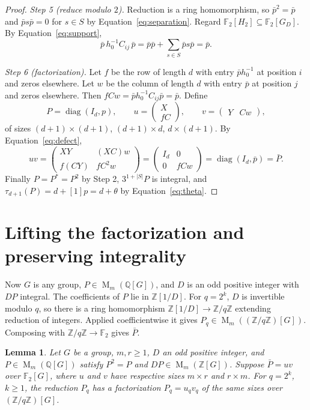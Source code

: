 \documentclass[11pt]{article}
\newtheorem{lemma}[theorem]{Lemma}
\theoremstyle{remark}
\numberwithin{equation}{section}
\newcommand{\F}{\mathbb F}
\newcommand{\Z}{\mathbb Z}
\newcommand{\Q}{\mathbb Q}
\newcommand{\Mat}{\operatorname{M}}
\newcommand{\diag}{\operatorname{diag}}
\begin{document}
\begin{proof}
\emph{Step 5 (reduce modulo $2$).} Reduction is a ring homomorphism, so $\bar p^2=\bar p$ and $\bar ps\bar p=0$ for $s\in S$ by Equation~\eqref{eq:separation}. Regard $\F_2[H_2]\subseteq\F_2[G_D]$. By Equation~\eqref{eq:support},
\[
 \bar p\,h_0^{-1}C_{ij}\,\bar p=\bar p\bar p+\sum_{s\in S}\bar ps\bar p=\bar p.
\]

\emph{Step 6 (factorization).} Let $f$ be the row of length $d$ with entry $\bar ph_0^{-1}$ at position $i$ and zeros elsewhere. Let $w$ be the column of length $d$ with entry $\bar p$ at position $j$ and zeros elsewhere. Then $fCw=\bar ph_0^{-1}C_{ij}\bar p=\bar p$. Define
\[
 P=\diag(I_d,p),\qquad
 u=\begin{pmatrix}X\\fC\end{pmatrix},\qquad
 v=\begin{pmatrix}Y&Cw\end{pmatrix},
\]
of sizes $(d+1)\times(d+1)$, $(d+1)\times d$, $d\times(d+1)$. By Equation~\eqref{eq:defect},
\[
 uv=\begin{pmatrix}XY&(XC)w\\f(CY)&fC^2w\end{pmatrix}
   =\begin{pmatrix}I_d&0\\0&fCw\end{pmatrix}=\diag(I_d,\bar p)=\bar P.
\]
Finally $P=P^*=P^2$ by Step 2, $3^{1+|S|}P$ is integral, and $\tau_{d+1}(P)=d+[1]p=d+\theta$ by Equation~\eqref{eq:theta}.
\end{proof}

\section{Lifting the factorization and preserving integrality}
\label{sec:lifting}

Now $G$ is any group, $P\in\Mat_m(\Q[G])$, and $D$ is an odd positive integer with $DP$ integral. The coefficients of $P$ lie in $\Z[1/D]$. For $q=2^k$, $D$ is invertible modulo $q$, so there is a ring homomorphism $\Z[1/D]\to\Z/q\Z$ extending reduction of integers. Applied coefficientwise it gives $P_q\in\Mat_m((\Z/q\Z)[G])$. Composing with $\Z/q\Z\to\F_2$ gives $\bar P$.

\begin{lemma}\label{lem:lift}
Let $G$ be a group, $m,r\ge1$, $D$ an odd positive integer, and
$P\in\Mat_m(\Q[G])$ satisfy $P^2=P$ and
$DP\in\Mat_m(\Z[G])$. Suppose $\bar P=uv$ over $\F_2[G]$, where $u$ and $v$
have respective sizes $m\times r$ and $r\times m$. For $q=2^k$,
$k\ge1$, the reduction $P_q$ has a factorization
$P_q=u_qv_q$ of the same sizes over $(\Z/q\Z)[G]$.
\end{lemma}
\end{document}
